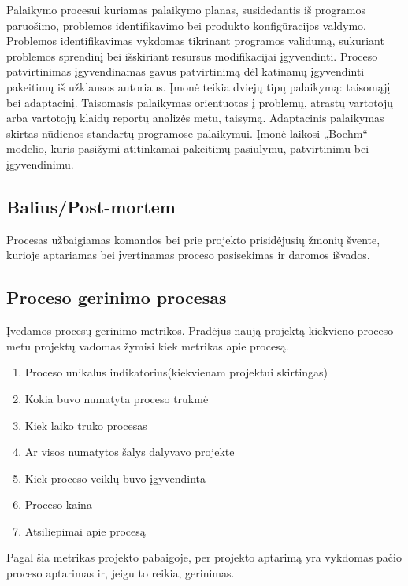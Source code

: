 \documentclass{VUMIFPSkursinis}
\begin{document}
	Palaikymo procesui kuriamas palaikymo planas, susidedantis iš programos paruošimo, problemos identifikavimo bei produkto konfigūracijos valdymo.
	Problemos identifikavimas vykdomas tikrinant programos validumą, sukuriant problemos sprendinį bei išskiriant resursus modifikacijai įgyvendinti.
	Proceso patvirtinimas įgyvendinamas gavus patvirtinimą dėl katinamų įgyvendinti pakeitimų iš užklausos autoriaus.
	Įmonė teikia dviejų tipų palaikymą: taisomąjį bei adaptacinį. Taisomasis palaikymas orientuotas į problemų, atrastų vartotojų arba vartotojų klaidų reportų analizės metu, taisymą.
	Adaptacinis palaikymas skirtas nūdienos standartų programose palaikymui. Įmonė laikosi „Boehm“ modelio, kuris pasižymi atitinkamai pakeitimų pasiūlymu, patvirtinimu bei įgyvendinimu.
	\label{img:boehmsModel}

	\subsection{Balius/Post-mortem}
	Procesas užbaigiamas komandos bei prie projekto prisidėjusių žmonių švente, kurioje aptariamas bei įvertinamas proceso pasisekimas ir daromos išvados.

	\subsection{Proceso gerinimo procesas}
		Įvedamos procesų gerinimo metrikos.
		Pradėjus naują projektą kiekvieno proceso metu projektų vadomas žymisi kiek metrikas apie procesą.
			\begin{enumerate}
				\item{Proceso unikalus indikatorius(kiekvienam projektui skirtingas)}
				\item{Kokia buvo numatyta proceso trukmė}
				\item{Kiek laiko truko procesas}
				\item{Ar visos numatytos šalys dalyvavo projekte}
				\item{Kiek proceso veiklų buvo įgyvendinta}
				\item{Proceso kaina}
				\item{Atsiliepimai apie procesą}
			\end{enumerate}
		Pagal šia metrikas projekto pabaigoje, per projekto aptarimą yra vykdomas pačio proceso aptarimas ir, jeigu to reikia, gerinimas.
\end{document}
